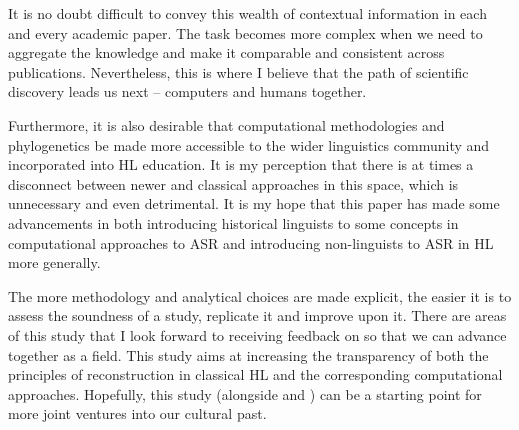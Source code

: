 \documentclass[12pt,letterpaper]{article}
\begin{document}
It is no doubt difficult to convey this wealth of contextual information in each and every academic paper. The task becomes more complex when we need to aggregate the knowledge and make it comparable and consistent across publications. Nevertheless, this is where I believe that the path of scientific discovery leads us next -- computers and humans together.

Furthermore, it is also desirable that computational methodologies and phylogenetics be made more accessible to the wider linguistics community and incorporated into HL education. It is my perception that there is at times a disconnect between newer and classical approaches in this space, which is unnecessary and even detrimental. It is my hope that this paper has made some advancements in both introducing historical linguists to some concepts in computational approaches to ASR and introducing non-linguists to ASR in HL more generally.

The more methodology and analytical choices are made explicit, the easier it is to assess the soundness of a study, replicate it and improve upon it. There are areas of this study that I look forward to receiving feedback on so that we can advance together as a field. This study aims at increasing the transparency of both the principles of reconstruction in classical HL and the corresponding computational approaches. Hopefully, this study (alongside \citealt{carling2021reconstructing} and \citealt{goldstein_2022}) can be a starting point for more joint ventures into our cultural past.






\end{document}
